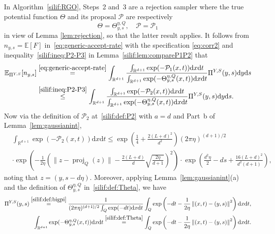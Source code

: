 \documentclass[11pt,letterpaper]{article}
\newcommand{\R}{\mathbb{R}}
\newcommand{\norm}[1]{\left\lVert #1 \right\rVert}
\newcommand{\E}{\mathbb{E}}
\newcommand{\nn}{\nonumber}
\newcommand{\D}{\mathrm{d}}
\newcommand{\brac}[1]{\left( #1\right)}
\begin{document}
In Algorithm~\ref{silif:RGO}, Steps~2 and~3 are a rejection sampler where the true potential function $\Theta$ and its proposal $\mathcal{P}$ are respectively 
 \begin{equation}\label{eq:corr2}
      \Theta = \Theta^{\eta,Q}_{y,s}, \quad \mathcal{P} = \mathcal{P}_1
 \end{equation}
 in view of Lemma \ref{lem:rejection}, so that the latter result applies. It follows from $n_{y,s}=\E[F]$ in~\eqref{eq:generic-accept-rate} with the specification \eqref{eq:corr2} and inequality~\eqref{silif:ineq:P2-P3} in Lemma~\ref{silif:lem:compareP1P2} that
\begin{align}
\label{silif:for:averagerejectionnotwarmsepa}
 \E_{\Pi^{Y,S}} [n_{y,s}]
 &\stackrel{\eqref{eq:generic-accept-rate}}= \int_{\R^{d+1}} \frac{\int_{\R^{d+1}} \exp(-\mathcal{P}_1(x,t))  \D x  \D t}{\int_{\R^{d+1}} \exp(-\Theta^{\eta,Q}_{y,s}(x,t))  \D x  \D t} \Pi^{Y,S}(y,s) \D y  \D s\nn\\
 & \stackrel{\eqref{silif:ineq:P2-P3}}\leq \int_{\R^{d+1}} \frac{\int_{\R^{d+1}} \exp(-\mathcal{P}_2(x,t))  \D x  \D t}{\int_{\R^{d+1}} \exp(-\Theta^{\eta,Q}_{y,s}(x,t))  \D x  \D t} \Pi^{Y,S}(y,s) \D y  \D s .
\end{align}
Now via the definition of $\mathcal{P}_2$ at~\eqref{silif:def:P2} with $a=d$ and Part~b of Lemma~\ref{lem:gaussianint}, 
\begin{align}
\label{silif:sepa:boundintP3}
&\int_{\R^{d+1}} \exp(-\mathcal{P}_2(x,t))  \D x  \D t
\leq \exp\brac{\frac{1}{4}+\frac{2(L+d)^2}{d^2}}(2\pi\eta)^{(d+1)/2}\nn\\
&\cdot \exp\brac{-\frac{1}{2\eta}\left(\|z-\operatorname{proj}_Q(z)\| - \frac{2(L+d)}{d}\sqrt{\frac{2\eta}{d+1}}\right)^2 }
\cdot\exp\brac{\frac{d^2\eta}{2} - d s+\frac{16(L+d)^2}{d^2(d+1)} }, 
\end{align}
noting that $z=(y,s-d\eta)$. 
Moreover, applying Lemma~\ref{lem:gaussianint}(a) and the definition of $\Theta^{\eta,Q}_{y,s}$ in~\eqref{silif:def:Theta}, we have
\begin{align}
    \Pi^{Y,S}(y,s)\stackrel{\eqref{silif:def:bigpi}}=\frac{1}{(2\pi \eta)^{(d+1)/2} \int_{Q} \exp(- d t)\D x \D t} \int_Q \exp\brac{- d t-\frac{1}{2\eta}\norm{(x,t)-(y,s)}^2 }\D x \D t, \label{silif:for:piYS} \\
    \int_{\R^{d+1}} \exp(-\Theta^{\eta,Q}_{y,s}(x,t))  \D x  \D t \stackrel{\eqref{silif:def:Theta}}= \int_Q \exp\brac{- d t-\frac{1}{2\eta}\norm{(x,t)-(y,s)}^2 }\D x \D t. \label{eq:int-theta}
\end{align}
\end{document}
